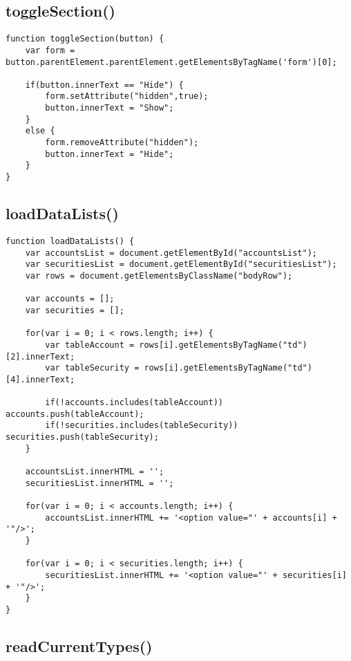 \documentclass[letterpaper]{article}
\begin{document}
\subsection{toggleSection()}

\begin{lstlisting}[firstnumber=693]
function toggleSection(button) {
    var form = button.parentElement.parentElement.getElementsByTagName('form')[0];

    if(button.innerText == "Hide") {
        form.setAttribute("hidden",true);
        button.innerText = "Show";
    }
    else {
        form.removeAttribute("hidden");
        button.innerText = "Hide";
    }
}
\end{lstlisting}

\subsection{loadDataLists()}

\begin{lstlisting}[firstnumber=706]
function loadDataLists() {
    var accountsList = document.getElementById("accountsList");
    var securitiesList = document.getElementById("securitiesList");
    var rows = document.getElementsByClassName("bodyRow");

    var accounts = [];
    var securities = [];

    for(var i = 0; i < rows.length; i++) {
        var tableAccount = rows[i].getElementsByTagName("td")[2].innerText;
        var tableSecurity = rows[i].getElementsByTagName("td")[4].innerText;

        if(!accounts.includes(tableAccount)) accounts.push(tableAccount);
        if(!securities.includes(tableSecurity)) securities.push(tableSecurity);
    }

    accountsList.innerHTML = '';
    securitiesList.innerHTML = '';

    for(var i = 0; i < accounts.length; i++) {
        accountsList.innerHTML += '<option value="' + accounts[i] + '"/>';
    }

    for(var i = 0; i < securities.length; i++) {
        securitiesList.innerHTML += '<option value="' + securities[i] + '"/>';
    }
}
\end{lstlisting}

\subsection{readCurrentTypes()}
\end{document}
